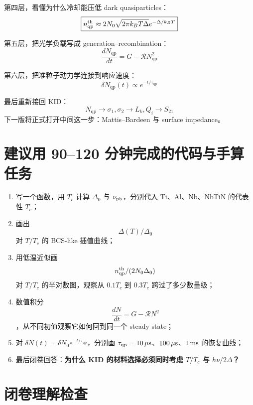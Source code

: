 \documentclass[11pt,a4paper,openany]{ctexrep}
\newcommand{\qp}{\mathrm{qp}}
\begin{document}
第四层，看懂为什么冷却能压低 dark quasiparticles：
\[
\boxed{
n_{\qp}^{\rm th}
\approx
2N_0\sqrt{2\pi k_BT\Delta}
e^{-\Delta/k_BT}
}
\]

第五层，把光学负载写成 generation--recombination：
\[
\boxed{
\frac{dN_{\qp}}{dt}
=
G-\mathcal{R}N_{\qp}^2
}
\]

第六层，把准粒子动力学连接到响应速度：
\[
\boxed{
\delta N_{\qp}(t)\propto e^{-t/\tau_{\qp}}
}
\]

最后重新接回 KID：
\[
\boxed{
N_{\qp}
\rightarrow
\sigma_1,\sigma_2
\rightarrow
L_k,Q_i
\rightarrow
S_{21}
}
\]
下一版将正式打开中间这一步：Mattis--Bardeen 与 surface impedance。

\section{建议用 90--120 分钟完成的代码与手算任务}

\begin{enumerate}
  \item 写一个函数，用 $T_c$ 计算 $\Delta_0$ 与 $\nu_{\rm pb}$，分别代入 Ti、Al、Nb、NbTiN 的代表性 $T_c$；
  \item 画出
  \[
  \Delta(T)/\Delta_0
  \]
  对 $T/T_c$ 的 BCS-like 插值曲线；
  \item 用低温近似画
  \[
  n_{\qp}^{\rm th}/(2N_0\Delta_0)
  \]
  对 $T/T_c$ 的半对数图，观察从 $0.1T_c$ 到 $0.3T_c$ 跨过了多少数量级；
  \item 数值积分
  \[
  \frac{dN}{dt}=G-\mathcal{R}N^2
  \]
  ，从不同初值观察它如何回到同一个 steady state；
  \item 对 $\delta N(t)=\delta N_0e^{-t/\tau_{\qp}}$，分别画 $\tau_{\qp}=10\,\mu{\rm s}$、$100\,\mu{\rm s}$、$1\,{\rm ms}$ 的恢复曲线；
  \item 最后闭卷回答：\textbf{为什么 KID 的材料选择必须同时考虑 $T/T_c$ 与 $h\nu/2\Delta$？}
\end{enumerate}

\section{闭卷理解检查}
\end{document}
